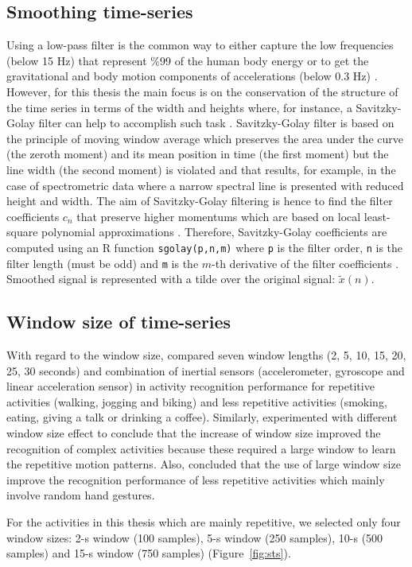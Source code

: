 \subsection{Smoothing time-series}
Using a low-pass filter is the common way to either capture the low 
frequencies (below 15 Hz) that represent \%99 of the human body 
energy or to get the gravitational and body motion components of 
accelerations (below 0.3 Hz) \citep{anguita2013}.
However, for this thesis the main focus is on the conservation of the 
structure of the time series in terms of the width and heights where, 
for instance, a Savitzky-Golay filter can help to accomplish such task 
\citep{press1992}. Savitzky-Golay filter is based on the principle of moving 
window average which preserves the area under the curve (the zeroth moment)
and its mean position in time (the first moment) but the line width 
(the second moment) is violated and that results, for example, in the case 
of spectrometric data where a narrow spectral line is presented with 
reduced height and width. 
The aim of Savitzky-Golay filtering is hence to find the filter coefficients 
$c_n$ that preserve higher momentums which are based on local least-square 
polynomial approximations 
\citep{savitzkygolay1964, press1992, schafer2011}.
Therefore, Savitzky-Golay coefficients are computed using an R function 
\texttt{sgolay(p,n,m)} where \texttt{p} is the filter order, 
\texttt{n} is the filter length (must be odd) 
and \texttt{m} is the $m$-th derivative of the filter coefficients 
\citep{Rsignal}. Smoothed signal is represented with a tilde over the 
original signal: $\tilde{x}(n)$.



\subsection{Window size of time-series}
With regard to the window size, \cite{shoaib2016} compared 
seven window lengths (2, 5, 10, 15, 20, 25, 30 seconds)
and combination of inertial sensors (accelerometer, gyroscope and linear 
acceleration sensor) in activity recognition performance for repetitive 
activities (walking, jogging and biking) and less repetitive activities 
(smoking, eating, giving a talk or drinking a coffee).
Similarly, \cite{shoaib2016} experimented with different window size effect 
to conclude that the increase of window size improved the recognition of 
complex activities because these required a large window to learn the 
repetitive motion patterns. Also, \cite{shoaib2016} concluded that the use 
of large window size improve the recognition performance of less repetitive 
activities which mainly involve random hand gestures.

For the activities in this thesis which are mainly repetitive, we selected 
only four window sizes: 2-s window (100 samples), 5-s window (250 samples), 
10-s (500 samples) and 15-s window (750 samples) (Figure~\ref{fig:sts}).




